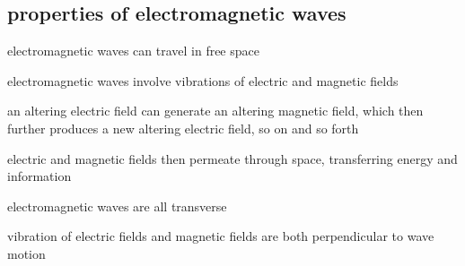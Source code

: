 \subsection{properties of electromagnetic waves}

\cmt electromagnetic waves can travel in free space

\cmt electromagnetic waves involve vibrations of electric and magnetic fields
	
an altering electric field can generate an altering magnetic field, which then further produces a new altering electric field, so on and so forth

electric and magnetic fields then permeate through space, transferring energy and information
	
\cmt electromagnetic waves are all transverse
	
vibration of electric fields and magnetic fields are both perpendicular to wave motion

